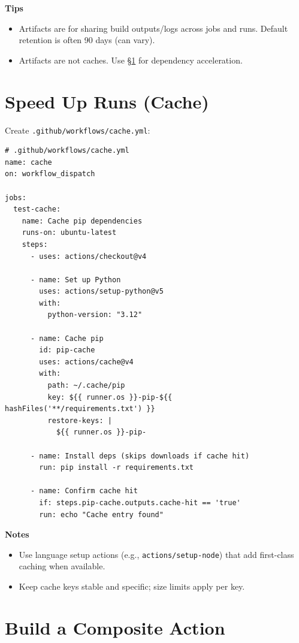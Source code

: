 \documentclass[11pt]{article}
\begin{document}
\begin{tcolorbox}
\textbf{Tips}
\begin{itemize}
  \item Artifacts are for sharing build outputs/logs across jobs and runs. Default retention is often 90 days (can vary).
  \item Artifacts are not caches. Use \S\ref{sec:cache} for dependency acceleration.
\end{itemize}
\end{tcolorbox}
\clearpage

\section{Speed Up Runs (Cache)}\label{sec:cache}
Create \texttt{.github/workflows/cache.yml}:
\begin{verbatim}
# .github/workflows/cache.yml
name: cache
on: workflow_dispatch

jobs:
  test-cache:
    name: Cache pip dependencies
    runs-on: ubuntu-latest
    steps:
      - uses: actions/checkout@v4

      - name: Set up Python
        uses: actions/setup-python@v5
        with:
          python-version: "3.12"

      - name: Cache pip
        id: pip-cache
        uses: actions/cache@v4
        with:
          path: ~/.cache/pip
          key: ${{ runner.os }}-pip-${{ hashFiles('**/requirements.txt') }}
          restore-keys: |
            ${{ runner.os }}-pip-

      - name: Install deps (skips downloads if cache hit)
        run: pip install -r requirements.txt

      - name: Confirm cache hit
        if: steps.pip-cache.outputs.cache-hit == 'true'
        run: echo "Cache entry found"
\end{verbatim}

\begin{tcolorbox}
\textbf{Notes}
\begin{itemize}
  \item Use language setup actions (e.g., \texttt{actions/setup-node}) that add first-class caching when available.
  \item Keep cache keys stable and specific; size limits apply per key.
\end{itemize}
\end{tcolorbox}
\clearpage

\section{Build a Composite Action}
\end{document}
